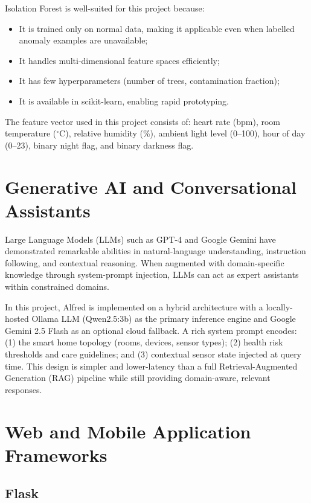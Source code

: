 Isolation Forest is well-suited for this project because:
\begin{itemize}
    \item It is trained only on normal data, making it applicable even when labelled anomaly examples are unavailable;
    \item It handles multi-dimensional feature spaces efficiently;
    \item It has few hyperparameters (number of trees, contamination fraction);
    \item It is available in scikit-learn, enabling rapid prototyping.
\end{itemize}

The feature vector used in this project consists of: heart rate (bpm), room temperature ($^\circ$C), relative humidity (\%), ambient light level (0--100), hour of day (0--23), binary night flag, and binary darkness flag.

\section{Generative AI and Conversational Assistants}

Large Language Models (LLMs) such as GPT-4 \cite{OpenAI2023} and Google Gemini \cite{Gemini2024} have demonstrated remarkable abilities in natural-language understanding, instruction following, and contextual reasoning. When augmented with domain-specific knowledge through system-prompt injection, LLMs can act as expert assistants within constrained domains.

In this project, Alfred is implemented on a hybrid architecture with a locally-hosted Ollama LLM \cite{Ollama2023} (Qwen2.5:3b) as the primary inference engine and Google Gemini 2.5 Flash \cite{Gemini2024} as an optional cloud fallback. A rich system prompt encodes: (1) the smart home topology (rooms, devices, sensor types); (2) health risk thresholds and care guidelines; and (3) contextual sensor state injected at query time. This design is simpler and lower-latency than a full Retrieval-Augmented Generation (RAG) pipeline while still providing domain-aware, relevant responses.

\section{Web and Mobile Application Frameworks}

\subsection{Flask}

